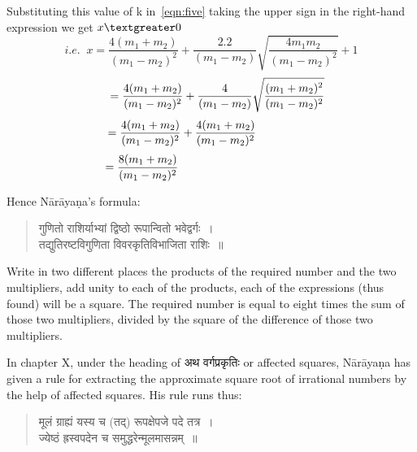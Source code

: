 \documentclass[11pt, openany]{book}
\begin{document}
 Substituting this value of k in~\eqref{eqn:five} taking the upper sign 
in the right-hand expression we get $x\textgreater 0$
\begin{equation*}
    i.e.\;\; x = \dfrac{4(m_{1}+m_{2})}{(m_{1} - m_{2})^{2}} +
\dfrac{2.2}{(m_{1} - m_{2})}
\sqrt{\dfrac{4m_{1}m_{2}}{(m_{1} - m_{2})^{2}}} + 1
\end{equation*}
\begin{equation*}
 = \dfrac{4(m_{1}+m_{2})}{(m_{1} - m_{2})^{2}} +
\dfrac{4}{(m_{1} - m_{2})}
\sqrt{\dfrac{(m_{1} + m_{2})^{2}}{(m_{1} - m_{2})^{2}}} \hspace{-4mm}
\end{equation*}
\begin{equation*}
= \dfrac{4(m_{1}+m_{2})}{(m_{1} - m_{2})^{2}} +
\dfrac{4(m_{1}+m_{2})}{(m_{1} - m_{2})^{2}} \hspace{1.8cm}
\end{equation*}
\begin{equation*}
    = \dfrac{8(m_{1}+m_{2})}{(m_{1} - m_{2})^{2}} \hspace{4.3cm}
\end{equation*}
 \vspace{0.5mm}
 
 Hence Nārāyaṇa's formula: 
\begin{quote}
    \qt 
     गुणितो राशिर्याभ्यां द्विष्ठो रूपान्वितो भवेद्वर्गः~। \\
 तद्युतिरष्टविगुणिता विवरकृतिविभाजिता राशिः~॥~
\end{quote}

 Write in two different places the products of the required 
number and the two multipliers, add unity to each of the 
products, each of the expressions (thus found) will be a square. 
The required number is equal to eight times the sum of those 
two multipliers, divided by the square of the difference of 
those two multipliers.

\newpage%

In chapter X, under the heading of अथ वर्गप्रकृतिः or affected 
squares, Nārāyaṇa has given a rule for extracting the approximate square root of irrational numbers by the help of affected 
squares. His rule runs thus: 
\vspace{-2mm}

\begin{quote}
    \qt 
    मूलं ग्राह्यं यस्य च (तद्) रूपक्षेपजे पदे तत्र~। \\
 ज्येष्ठं ह्रस्वपदेन च समुद्धरेन्मूलमासन्नम्~॥~
\end{quote}
\vspace{-2mm}
\end{document}
